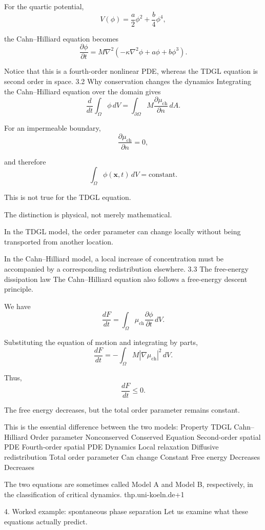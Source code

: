 For the quartic potential,
\[
V(\phi)=\frac a2\phi^2+\frac b4\phi^4,
\]

the Cahn–Hilliard equation becomes
\[
\boxed{
\frac{\partial\phi}{\partial t}
=
M\nabla^2
\left(
-\kappa\nabla^2\phi+a\phi+b\phi^3
\right).
}
\]

Notice that this is a fourth-order nonlinear PDE, whereas the TDGL equation is second order in space.
3.2 Why conservation changes the dynamics
Integrating the Cahn–Hilliard equation over the domain gives
\[
\frac{d}{dt}\int_\Omega\phi\,dV
=
\int_{\partial\Omega}
M\frac{\partial\mu_{\mathrm{ch}}}{\partial n}\,dA.
\]

For an impermeable boundary,
\[
\frac{\partial\mu_{\mathrm{ch}}}{\partial n}=0,
\]

and therefore
\[
\boxed{
\int_\Omega\phi(\mathbf x,t)\,dV
=
\mathrm{constant}.
}
\]

This is not true for the TDGL equation.

The distinction is physical, not merely mathematical.

In the TDGL model, the order parameter can change locally without being transported from another location.

In the Cahn–Hilliard model, a local increase of concentration must be accompanied by a corresponding redistribution elsewhere.
3.3 The free-energy dissipation law
The Cahn–Hilliard equation also follows a free-energy descent principle.

We have
\[
\frac{dF}{dt}
=
\int_\Omega
\mu_{\mathrm{ch}}\frac{\partial\phi}{\partial t}\,dV.
\]

Substituting the equation of motion and integrating by parts,
\[
\frac{dF}{dt}
=
-\int_\Omega
M|\nabla\mu_{\mathrm{ch}}|^2\,dV.
\]

Thus,
\[
\boxed{
\frac{dF}{dt}\leq0.
}
\]

The free energy decreases, but the total order parameter remains constant.

This is the essential difference between the two models:
Property	TDGL	Cahn–Hilliard
Order parameter	Nonconserved	Conserved
Equation	Second-order spatial PDE	Fourth-order spatial PDE
Dynamics	Local relaxation	Diffusive redistribution
Total order parameter	Can change	Constant
Free energy	Decreases	Decreases

The two equations are sometimes called Model A and Model B, respectively, in the classification of critical dynamics. 
thp.uni-koeln.de+1

4. Worked example: spontaneous phase separation
Let us examine what these equations actually predict.

